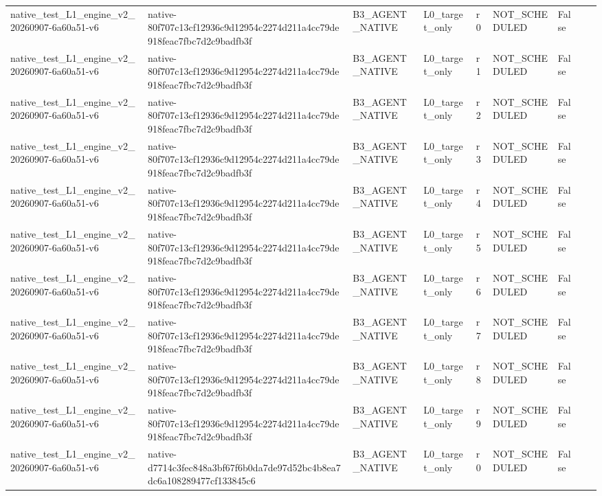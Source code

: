 \begin{tabular}{lllllllll}
native\_test\_L1\_engine\_v2\_20260907-6a60a51-v6 & native-80f707c13cf12936c9d12954c2274d211a4cc79de918feac7fbc7d2c9badfb3f & B3\_AGENT\_NATIVE & L0\_target\_only & r0 & NOT\_SCHEDULED & False &  &  \\
native\_test\_L1\_engine\_v2\_20260907-6a60a51-v6 & native-80f707c13cf12936c9d12954c2274d211a4cc79de918feac7fbc7d2c9badfb3f & B3\_AGENT\_NATIVE & L0\_target\_only & r1 & NOT\_SCHEDULED & False &  &  \\
native\_test\_L1\_engine\_v2\_20260907-6a60a51-v6 & native-80f707c13cf12936c9d12954c2274d211a4cc79de918feac7fbc7d2c9badfb3f & B3\_AGENT\_NATIVE & L0\_target\_only & r2 & NOT\_SCHEDULED & False &  &  \\
native\_test\_L1\_engine\_v2\_20260907-6a60a51-v6 & native-80f707c13cf12936c9d12954c2274d211a4cc79de918feac7fbc7d2c9badfb3f & B3\_AGENT\_NATIVE & L0\_target\_only & r3 & NOT\_SCHEDULED & False &  &  \\
native\_test\_L1\_engine\_v2\_20260907-6a60a51-v6 & native-80f707c13cf12936c9d12954c2274d211a4cc79de918feac7fbc7d2c9badfb3f & B3\_AGENT\_NATIVE & L0\_target\_only & r4 & NOT\_SCHEDULED & False &  &  \\
native\_test\_L1\_engine\_v2\_20260907-6a60a51-v6 & native-80f707c13cf12936c9d12954c2274d211a4cc79de918feac7fbc7d2c9badfb3f & B3\_AGENT\_NATIVE & L0\_target\_only & r5 & NOT\_SCHEDULED & False &  &  \\
native\_test\_L1\_engine\_v2\_20260907-6a60a51-v6 & native-80f707c13cf12936c9d12954c2274d211a4cc79de918feac7fbc7d2c9badfb3f & B3\_AGENT\_NATIVE & L0\_target\_only & r6 & NOT\_SCHEDULED & False &  &  \\
native\_test\_L1\_engine\_v2\_20260907-6a60a51-v6 & native-80f707c13cf12936c9d12954c2274d211a4cc79de918feac7fbc7d2c9badfb3f & B3\_AGENT\_NATIVE & L0\_target\_only & r7 & NOT\_SCHEDULED & False &  &  \\
native\_test\_L1\_engine\_v2\_20260907-6a60a51-v6 & native-80f707c13cf12936c9d12954c2274d211a4cc79de918feac7fbc7d2c9badfb3f & B3\_AGENT\_NATIVE & L0\_target\_only & r8 & NOT\_SCHEDULED & False &  &  \\
native\_test\_L1\_engine\_v2\_20260907-6a60a51-v6 & native-80f707c13cf12936c9d12954c2274d211a4cc79de918feac7fbc7d2c9badfb3f & B3\_AGENT\_NATIVE & L0\_target\_only & r9 & NOT\_SCHEDULED & False &  &  \\
native\_test\_L1\_engine\_v2\_20260907-6a60a51-v6 & native-d7714c3fec848a3bf67f6b0da7de97d52bc4b8ea7dc6a108289477cf133845c6 & B3\_AGENT\_NATIVE & L0\_target\_only & r0 & NOT\_SCHEDULED & False &  &  \\

\end{tabular}
